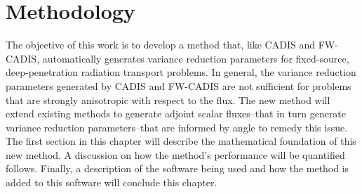 \chapter{Methodology}

The objective of this work is to develop a method that, like CADIS and FW-CADIS,
automatically generates variance reduction parameters for fixed-source,
deep-penetration radiation transport problems. In general, the variance reduction
parameters generated by CADIS and FW-CADIS are not sufficient for
problems that are strongly
anisotropic with respect to the flux. The new method will extend existing
methods to generate adjoint scalar fluxes--that in turn generate variance reduction
parameters--that are informed by angle to remedy this issue. The first section
in this chapter will describe
the mathematical foundation of this new method. A discussion on how
the method's performance will be quantified follows. Finally, a description of
the software being used and how the method is added to this software will
conclude this chapter.




